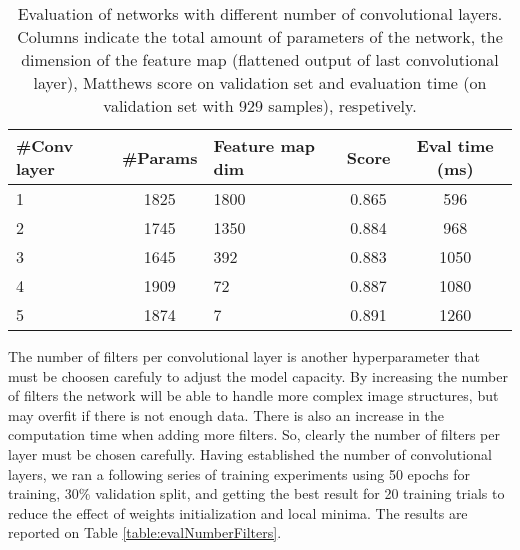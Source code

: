       	\begin{table}
      	 \begin{center}
      	  \label{table:evalNumberConvLayers}
      	  \caption{Evaluation of networks with different number of convolutional layers. Columns indicate the total amount of parameters of the network, the dimension of the feature map (flattened output of last convolutional layer), Matthews score on validation set and evaluation time (on validation set with 929 samples), respetively.}
      	  \begin{tabular}{ | l | c | l | c | c |}
      	    \hline
      	    \#Conv layer & \#Params & Feature map dim & Score & Eval time (ms)   \\ \hline
      	    1            & 1825    &  1800           & 0.865 &  596             \\
      	    2            & 1745    &  1350           & 0.884 &  968             \\
      	    3            & 1645    &  392            & 0.883 &  1050            \\
      	    4            & 1909    &  72             & 0.887 &  1080            \\
      	    5            & 1874    &  7              & 0.891 &  1260            \\ \hline
      		  \end{tabular}
      		\end{center}
      	 \end{table}

        The number of filters per convolutional layer is another hyperparameter that must be choosen carefuly to adjust the model capacity. By increasing the number of filters the network will be able to handle more complex image structures, but may overfit if there is not enough data. There is also an increase in the computation time when adding more filters. So, clearly the number of filters per layer must be chosen carefully. Having established the number of convolutional layers, we ran a following series of training experiments using 50 epochs for training, 30\% validation split, and getting the best result for 20 training trials to reduce the effect of weights initialization and local minima. The results are reported on Table \ref{table:evalNumberFilters}.

